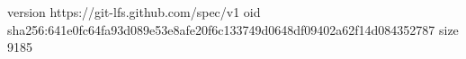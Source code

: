 version https://git-lfs.github.com/spec/v1
oid sha256:641e0fc64fa93d089e53e8afe20f6c133749d0648df09402a62f14d084352787
size 9185
